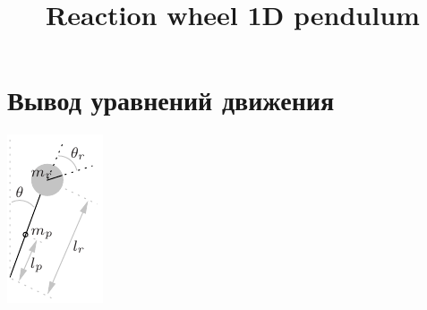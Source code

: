 \documentclass{article}
\title{Reaction wheel 1D pendulum}
\author{}
\date{}
\begin{document}
\maketitle

\section{Вывод уравнений движения}

\begin{minipage}[t]{.2\linewidth}
\vspace{0cm}
\centerline{\includegraphics[width=\linewidth]{img/schema}}
\end{minipage}
\end{document}
